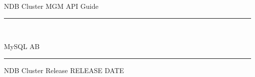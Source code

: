 \documentclass[a4paper]{book}
\begin{document}
\begin{titlepage}
\vspace*{7cm}
\begin{center}
{\Huge NDB Cluster MGM API Guide \mbox{}\vspace{-3cm}\mbox{}\hrule\bigskip\bigskip\bigskip\bigskip\mbox{}\Huge{}}\\\vspace*{1cm}
\begin{center}\LARGE{MySQL AB}\end{center}\hfill\bigskip\bigskip\bigskip\hrule\bigskip\bigskip\bigskip\bigskip\bigskip\bigskip\bigskip\bigskip\bigskip\bigskip\bigskip\bigskip NDB Cluster Release RELEASE
\bigskip\bigskip\bigskip\bigskip\bigskip\hfill\vspace*{0.5cm}
{\small DATE}\\
\end{center}
\end{titlepage}
\clearemptydoublepage
{}
\tableofcontents
\clearemptydoublepage
{}
\end{document}
